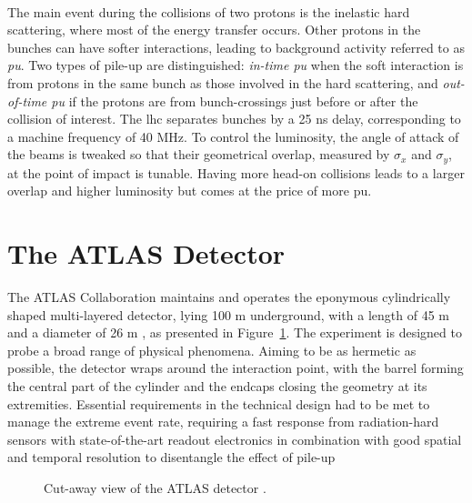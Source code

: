 \paragraph{}The main event during the collisions of two protons is the inelastic hard scattering, where most of the energy transfer occurs. Other protons in the bunches can have softer interactions, leading to background activity referred to as \textit{\gls{pu}}. Two types of pile-up are distinguished: \textit{in-time \gls{pu}} when the soft interaction is from protons in the same bunch as those involved in the hard scattering, and \textit{out-of-time \gls{pu}} if the protons are from bunch-crossings just before or after the collision of interest. The \gls{lhc} separates bunches by a 25 ns delay, corresponding to a machine frequency of 40 MHz. To control the luminosity, the angle of attack of the beams is tweaked so that their geometrical overlap, measured by $\sigma_x$ and $\sigma_y$, at the point of impact is tunable. Having more head-on collisions leads to a larger overlap and higher luminosity but comes at the price of more \gls{pu}. 

\section{The ATLAS Detector}\label{sec-ATLASDet}
The ATLAS Collaboration maintains and operates the eponymous cylindrically shaped multi-layered detector, lying 100 m underground, with a length of 45 m and a diameter of 26 m \cite{TheATLASCollaboration_2008}, as presented in Figure~\ref{fig-AtlasDec}. The experiment is designed to probe a broad range of physical phenomena. Aiming to be as hermetic as possible, the detector wraps around the interaction point, with the barrel forming the central part of the cylinder and the endcaps closing the geometry at its extremities. Essential requirements in the technical design had to be met to manage the extreme event rate, requiring a fast response from radiation-hard sensors with state-of-the-art readout electronics in combination with good spatial and temporal resolution to disentangle the effect of pile-up

\begin{figure}[!h]
\centering
\hspace{-1.25cm}
\caption{Cut-away view of the ATLAS detector \cite{ATLASschematics}.}
\label{fig-AtlasDec}
\end{figure}

